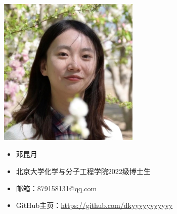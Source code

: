 \begin{figure}[ht]
    \hfill
    \begin{minipage}[c]{0.4\textwidth}
        \includegraphics[width=0.6\textwidth]{./image/author-dky.png}
    \end{minipage}
    \hfil
    \begin{minipage}[c]{0.5\textwidth}
        \begin{itemize}
            \item 邓昆月
            \item 北京大学化学与分子工程学院2022级博士生
            \item 邮箱：879158131@qq.com
            \item GitHub主页：\href{https://github.com/dkyyyyyyyyyyy}{https://github.com/dkyyyyyyyyyyy}
        \end{itemize}
    \end{minipage}
    \vspace{0.5cm}


\end{figure}
